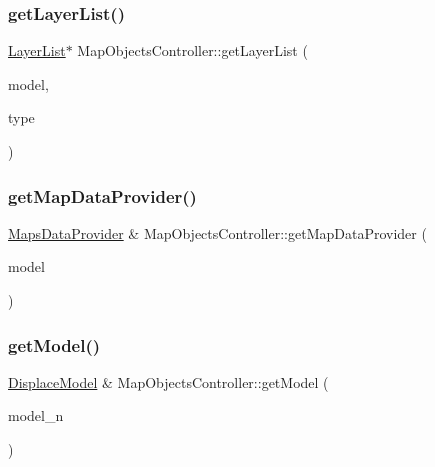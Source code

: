 \mbox{\label{class_map_objects_controller_ad6f051f3641febd5bba8d2229749cae5}} 
\subsubsection{\texorpdfstring{getLayerList()}{getLayerList()}}
{\footnotesize\ttfamily \mbox{\hyperlink{class_map_objects_controller_1_1_layer_list}{Layer\+List}}$\ast$ Map\+Objects\+Controller\+::get\+Layer\+List (\begin{DoxyParamCaption}\item[{int}]{model,  }\item[{\mbox{\hyperlink{class_object_tree_model_a379e9d6b0d381853785adf62095ba4e3}{Object\+Tree\+Model\+::\+Category}}}]{type }\end{DoxyParamCaption})\hspace{0.3cm}{\ttfamily [inline]}}

\mbox{\label{class_map_objects_controller_a5ff7247c767701b167246621e58c3662}} 
\subsubsection{\texorpdfstring{getMapDataProvider()}{getMapDataProvider()}}
{\footnotesize\ttfamily \mbox{\hyperlink{class_maps_data_provider}{Maps\+Data\+Provider}} \& Map\+Objects\+Controller\+::get\+Map\+Data\+Provider (\begin{DoxyParamCaption}\item[{int}]{model }\end{DoxyParamCaption})}

\mbox{\label{class_map_objects_controller_a4ef22c987718d71c7b44c9760e9e1e26}} 
\subsubsection{\texorpdfstring{getModel()}{getModel()}}
{\footnotesize\ttfamily \mbox{\hyperlink{class_displace_model}{Displace\+Model}} \& Map\+Objects\+Controller\+::get\+Model (\begin{DoxyParamCaption}\item[{int}]{model\+\_\+n }\end{DoxyParamCaption})}

